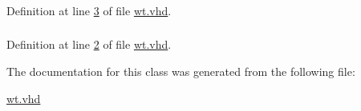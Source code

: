 \hypertarget{classwt_aa4b2b25246a821511120e3149b003563}{}
\subsubsection[{S\+T\+D\+\_\+\+L\+O\+G\+I\+C\+\_\+1164}]{\hspace{0.3cm}{\ttfamily [Package]}}\label{classwt_aa4b2b25246a821511120e3149b003563}


Definition at line \hyperlink{wt_8vhd_source_l00003}{3} of file \hyperlink{wt_8vhd_source}{wt.\+vhd}.

\hypertarget{classwt_a241c3e72dd8024cc8ae831b1b2aed7db}{}
\subsubsection[{S\+T\+D\+\_\+\+L\+O\+G\+I\+C\+\_\+\+U\+N\+S\+I\+G\+N\+E\+D}]{\hspace{0.3cm}{\ttfamily [Package]}}\label{classwt_a241c3e72dd8024cc8ae831b1b2aed7db}


Definition at line \hyperlink{wt_8vhd_source_l00002}{2} of file \hyperlink{wt_8vhd_source}{wt.\+vhd}.



The documentation for this class was generated from the following file\+:\begin{DoxyCompactItemize}
\item 
\hyperlink{wt_8vhd}{wt.\+vhd}\end{DoxyCompactItemize}
